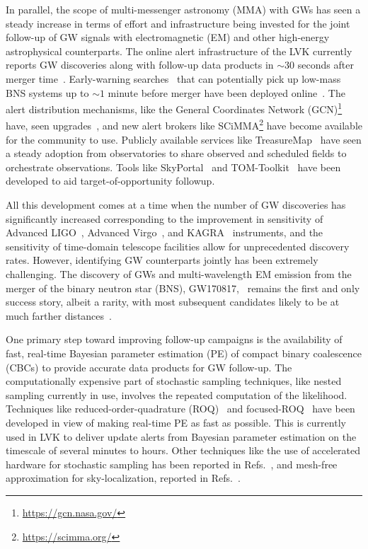 \begin{refsection}
In parallel, the scope of multi-messenger astronomy (MMA) with GWs has seen a steady increase in terms of effort and infrastructure being invested for the joint follow-up of GW signals with electromagnetic (EM) and other high-energy astrophysical counterparts. 
The online alert infrastructure of the LVK currently reports GW discoveries along with follow-up data products in $\sim 30$ seconds after merger time~\cite{Chaudhary_2024}. Early-warning searches~\cite{Cannon_2012} that can potentially pick up low-mass BNS systems up to $\sim 1$ minute before merger have been deployed online~\cite{Magee_2021}. 
The alert distribution mechanisms, like the General Coordinates Network (GCN)\footnote{\url{https://gcn.nasa.gov/}} have, seen upgrades~\cite{2022GCN.32419....1B}, and new alert brokers like SCiMMA\footnote{\url{https://scimma.org/}} have become available for the community to use.
Publicly available services like TreasureMap~\cite{2019GCN.26244....1W} have seen a steady adoption from observatories to share observed and scheduled fields to orchestrate observations. 
Tools like SkyPortal~\cite{skyportal2019} and TOM-Toolkit~\cite{tom_toolkit} have been developed to aid target-of-opportunity followup. 

All this development comes at a time when the number of GW discoveries has significantly increased corresponding to the improvement in sensitivity of Advanced LIGO~\cite{PhysRevD.102.062003, Aasi_2015}, Advanced Virgo~\cite{Acernese_2015}, and KAGRA~\cite{kagra} instruments, and the sensitivity of time-domain telescope facilities allow for unprecedented discovery rates. 
However, identifying GW counterparts jointly has been extremely challenging. 
The discovery of GWs and multi-wavelength EM emission from the merger of the binary neutron star (BNS), GW170817,~\cite{AbEA2017b, AbEA2017f} remains the first and only success story, albeit a rarity, with most subsequent candidates likely to be at much farther distances~\cite{2020NatAs...4..550C}. 

One primary step toward improving follow-up campaigns is the availability of fast, real-time Bayesian parameter estimation (PE) of compact binary coalescence (CBCs) to provide accurate data products for GW follow-up. 
The computationally expensive part of stochastic sampling techniques, like nested sampling currently in use, involves the repeated computation of the likelihood. 
Techniques like reduced-order-quadrature (ROQ)~\cite{Canizares:2014fya, morisaki2023rapidlocalizationinferencecompact} and focused-ROQ~\cite{Morisaki:2020oqk} have been developed in view of making real-time PE as fast as possible. 
This is currently used in LVK to deliver update alerts from Bayesian parameter estimation on the timescale of several minutes to hours. 
Other techniques like the use of accelerated hardware for stochastic sampling has been reported in Refs.~\cite{Talbot:2019okv, wong2023fastgravitationalwaveparameter}, and mesh-free approximation for sky-localization, reported in Refs.~\cite{PhysRevD.108.064055, PhysRevD.109.024053}.


\end{refsection}
